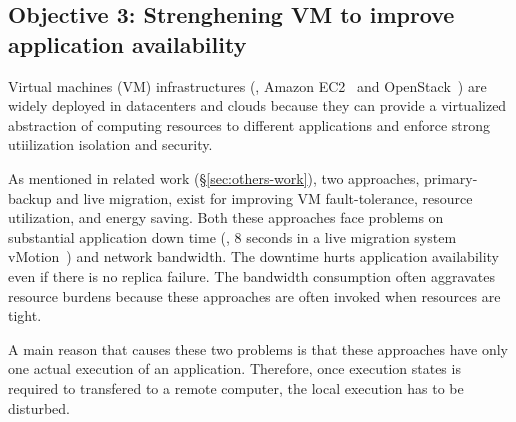\vspace{-.15in}\subsection{Objective 3: Strenghening VM to improve application 
availability}\label{sec:vm}\vspace{-.075in}




Virtual machines (VM) infrastructures (\eg, Amazon EC2~\cite{amazon:ec2} and 
OpenStack~\cite{openstack}) are widely deployed in datacenters and clouds 
because they can provide a virtualized abstraction of computing resources to 
different applications and enforce strong utiilization isolation and security. 

As mentioned in related work (\S\ref{sec:others-work}), two approaches, 
primary-backup and live migration, exist for improving VM fault-tolerance, 
resource utilization, and energy saving. Both these approaches face problems on 
substantial application down time (\eg, 8 seconds in a live migration system 
vMotion~\cite{vmotion}) and network bandwidth. The downtime hurts application 
availability even if there is no replica failure. The bandwidth consumption 
often aggravates resource burdens because these approaches are often invoked 
when resources are tight.

A main reason that causes these two problems is that these approaches have only 
one actual execution of an application. Therefore, once execution states is 
required to transfered to a remote computer, the local execution has to be 
disturbed.



% 



